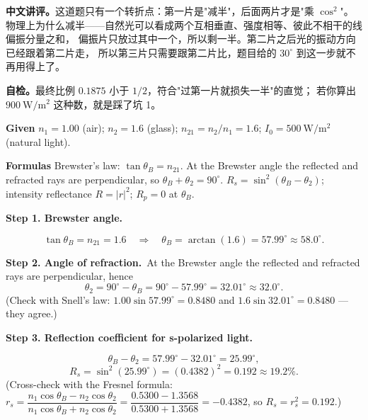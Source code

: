 ﻿\documentclass[11pt]{ctexart}
\begin{document}
\textbf{中文讲评。}这道题只有一个转折点：第一片是"减半"，后面两片才是"乘 $\cos^2$"。
物理上为什么减半——自然光可以看成两个互相垂直、强度相等、彼此不相干的线偏振分量之和，
偏振片只放过其中一个，所以剩一半。第二片之后光的振动方向已经跟着第二片走，
所以第三片只需要跟第二片比，题目给的 $30^\circ$ 到这一步就不再用得上了。

\textbf{自检。}最终比例 $0.1875$ 小于 $1/2$，符合"过第一片就损失一半"的直觉；
若你算出 $900\ \mathrm{W/m^2}$ 这种数，就是踩了坑 1。

\qbreak
{}


\textbf{Given}\quad
$n_1=1.00$ (air);\; $n_2=1.6$ (glass);\; $n_{21}=n_2/n_1=1.6$;\;
$I_0=500\ \mathrm{W/m^2}$ (natural light).

\textbf{Formulas}\quad
Brewster's law: $\tan\theta_B=n_{21}$.\;
At the Brewster angle the reflected and refracted rays are perpendicular, so
$\theta_B+\theta_2=90^\circ$.\;
$R_s=\sin^2(\theta_B-\theta_2)$;\; intensity reflectance $R=|r|^2$;\; $R_p=0$ at $\theta_B$.

\textbf{Step 1. Brewster angle.}\par\noindent\[
\tan\theta_B=n_{21}=1.6
\quad\Longrightarrow\quad
\theta_B=\arctan(1.6)=57.99^\circ\approx 58.0^\circ.
\]

\textbf{Step 2. Angle of refraction.}\ At the Brewster angle the reflected and refracted rays are perpendicular, hence
\[
\theta_2=90^\circ-\theta_B=90^\circ-57.99^\circ=32.01^\circ\approx 32.0^\circ .
\]
(Check with Snell's law: $1.00\sin 57.99^\circ=0.8480$ and $1.6\sin 32.01^\circ=0.8480$ — they agree.)

\textbf{Step 3. Reflection coefficient for s-polarized light.}\par\noindent\[
\theta_B-\theta_2=57.99^\circ-32.01^\circ=25.99^\circ,
\]
\[
R_s=\sin^2(25.99^\circ)=(0.4382)^2=0.192\approx 19.2\% .
\]
(Cross-check with the Fresnel formula:
$r_s=\dfrac{n_1\cos\theta_B-n_2\cos\theta_2}{n_1\cos\theta_B+n_2\cos\theta_2}
=\dfrac{0.5300-1.3568}{0.5300+1.3568}=-0.4382$, so $R_s=r_s^2=0.192$.)
\end{document}
